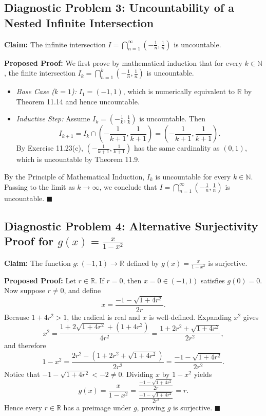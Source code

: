 \documentclass[11pt, letterpaper]{article}
\theoremstyle{definition}
\theoremstyle{remark}
\begin{document}
\subsection{Diagnostic Problem 3: Uncountability of a Nested Infinite Intersection}

\textbf{Claim:} The infinite intersection $I = \bigcap_{n=1}^{\infty} \left(-\frac{1}{n}, \frac{1}{n}\right)$ is uncountable.

\textbf{Proposed Proof:} We first prove by mathematical induction that for every $k \in \mathbb{N}$, the finite intersection $I_k = \bigcap_{n=1}^{k} \left(-\frac{1}{n}, \frac{1}{n}\right)$ is uncountable.
\begin{itemize}
    \item \emph{Base Case ($k = 1$):} $I_1 = (-1, 1)$, which is numerically equivalent to $\mathbb{R}$ by Theorem 11.14 and hence uncountable.
    \item \emph{Inductive Step:} Assume $I_k = \left(-\frac{1}{k}, \frac{1}{k}\right)$ is uncountable. Then
    \[
    I_{k+1} = I_k \cap \left(-\frac{1}{k+1}, \frac{1}{k+1}\right) = \left(-\frac{1}{k+1}, \frac{1}{k+1}\right).
    \]
    By Exercise 11.23(c), $\left(-\frac{1}{k+1}, \frac{1}{k+1}\right)$ has the same cardinality as $(0, 1)$, which is uncountable by Theorem 11.9.
\end{itemize}
By the Principle of Mathematical Induction, $I_k$ is uncountable for every $k \in \mathbb{N}$. Passing to the limit as $k \to \infty$, we conclude that $I = \bigcap_{n=1}^{\infty} \left(-\frac{1}{n}, \frac{1}{n}\right)$ is uncountable. $\blacksquare$

\subsection{Diagnostic Problem 4: Alternative Surjectivity Proof for $g(x) = \frac{x}{1 - x^2}$}

\textbf{Claim:} The function $g : (-1, 1) \to \mathbb{R}$ defined by $g(x) = \frac{x}{1 - x^2}$ is surjective.

\textbf{Proposed Proof:} Let $r \in \mathbb{R}$. If $r = 0$, then $x = 0 \in (-1, 1)$ satisfies $g(0) = 0$. Now suppose $r \neq 0$, and define
\[
x = \frac{-1 - \sqrt{1 + 4r^2}}{2r}.
\]
Because $1 + 4r^2 > 1$, the radical is real and $x$ is well-defined. Expanding $x^2$ gives
\[
x^2 = \frac{1 + 2\sqrt{1 + 4r^2} + (1 + 4r^2)}{4r^2} = \frac{1 + 2r^2 + \sqrt{1 + 4r^2}}{2r^2},
\]
and therefore
\[
1 - x^2 = \frac{2r^2 - \left(1 + 2r^2 + \sqrt{1 + 4r^2}\right)}{2r^2} = \frac{-1 - \sqrt{1 + 4r^2}}{2r^2}.
\]
Notice that $-1 - \sqrt{1 + 4r^2} < -2 \neq 0$. Dividing $x$ by $1 - x^2$ yields
\[
g(x) = \frac{x}{1 - x^2} = \frac{\frac{-1 - \sqrt{1 + 4r^2}}{2r}}{\frac{-1 - \sqrt{1 + 4r^2}}{2r^2}} = r.
\]
Hence every $r \in \mathbb{R}$ has a preimage under $g$, proving $g$ is surjective. $\blacksquare$
\end{document}
